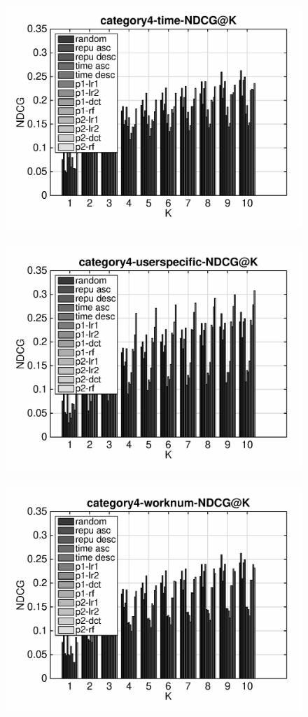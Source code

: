 \documentclass{article}
\begin{document}
\begin{figure}[ht]
\begin{flushleft}
\includegraphics[width=18cm,height=9cm]{category4-time-NDCG@K.eps}
\includegraphics[width=18cm,height=9cm]{category4-userspecific-NDCG@K.eps}
\includegraphics[width=18cm,height=9cm]{category4-worknum-NDCG@K.eps}
\end{flushleft}
\end{figure}
\end{document}
